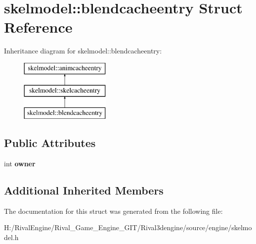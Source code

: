 \hypertarget{structskelmodel_1_1blendcacheentry}{}\section{skelmodel\+:\+:blendcacheentry Struct Reference}
\label{structskelmodel_1_1blendcacheentry}
Inheritance diagram for skelmodel\+:\+:blendcacheentry\+:\begin{figure}[H]
\begin{center}
\leavevmode
\includegraphics[height=3.000000cm]{structskelmodel_1_1blendcacheentry}
\end{center}
\end{figure}
\subsection*{Public Attributes}
\begin{DoxyCompactItemize}
\item 
\mbox{\label{structskelmodel_1_1blendcacheentry_a1996b49797c1a0b01985abbcdcdca2c7}} 
int {\bfseries owner}
\end{DoxyCompactItemize}
\subsection*{Additional Inherited Members}


The documentation for this struct was generated from the following file\+:\begin{DoxyCompactItemize}
\item 
H\+:/\+Rival\+Engine/\+Rival\+\_\+\+Game\+\_\+\+Engine\+\_\+\+G\+I\+T/\+Rival3dengine/source/engine/skelmodel.\+h\end{DoxyCompactItemize}
